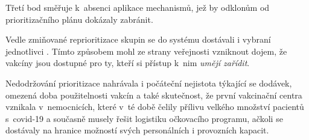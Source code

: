 Třetí bod směřuje k~absenci aplikace mechanismů, jež by odklonům od prioritizačního plánu dokázaly zabránit.

Vedle zmiňované reprioritizace skupin se do systému dostávali i vybraní jednotlivci \cite{logoc_namestkyne, logoc_kabatek, CTK2021JsemDenik, logo_hejtman, logo_predbihani}.
Tímto způsobem mohl ze strany veřejnosti vzniknout dojem, že vakcíny jsou dostupné pro ty, kteří si přístup k~nim \emph{umějí zařídit}. 

Nedodržování prioritizace nahrávala i počáteční nejistota týkající se dodávek, omezená doba použitelnosti vakcín a také skutečnost, že první vakcinační centra vznikala v~nemocnicích, které v~té době čelily přílivu velkého množství pacientů s~covid-19 a současně musely řešit logistiku očkovacího programu, ačkoli se dostávaly na hranice možností svých personálních i provozních kapacit. 


 
